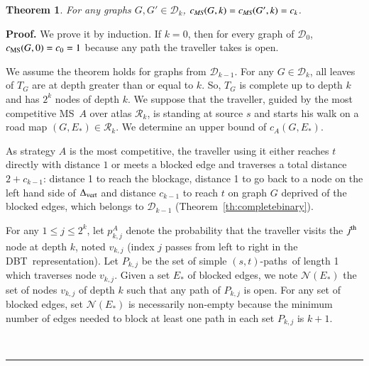 \documentclass[preprint]{elsarticle}
\newtheorem{theorem}{Theorem}
\newenvironment{proof}[1][Proof]{\textbf{#1.} }{\ \rule{0.5em}{0.5em}}
\newcommand{\ith}[1]{#1^{\mbox{\scriptsize{th}}}}
\newcommand{\stpaths}{$(s,t)$-paths}
\newcommand{\mcalr}{\mathcal{R}}
\newcommand{\mcald}{\mathcal{D}}
\newcommand{\mcaln}{\mathcal{N}}
\newcommand{\mts}{MS}
\newcommand{\deltavert}{\Delta_{\mbox{\scriptsize{vert}}}}
\newcommand{\cms}{c_{\mbox{\scriptsize{MS}}}}
\newcommand{\ebt}{DBT}
\begin{document}
\begin{theorem}
For any graphs $G, G' \in \mcald_k$, $c_{\emph{\scriptsize{MS}}}(G,k) = c_{\emph{\scriptsize{MS}}}(G',k) = c_k$.
\label{th:equalcompetitive}
\end{theorem}
\begin{proof}
We prove it by induction. If $k = 0$, then for every graph of $\mcald_0$, $\cms(G,0) = c_0 = 1$ because any path the traveller takes is open.

We assume the theorem holds for graphs from $\mcald_{k-1}$. For any $G \in \mcald_k$, all leaves of $T_G$ are at depth greater than or equal to $k$. So, $T_G$ is complete up to depth $k$ and has $2^k$ nodes of depth $k$. We suppose that the traveller, guided by the most competitive \mts ~$A$ over atlas $\mcalr_k$, is standing at source $s$ and starts his walk on a road map $\left(G,E_*\right) \in \mcalr_k$. We determine an upper bound of $c_A(G, E_*)$.

As strategy $A$ is the most competitive, the traveller using it either reaches $t$ directly with distance $1$ or meets a blocked edge and traverses a total distance $2 + c_{k-1}$: distance 1 to reach the blockage, distance 1 to go back to a node on the left hand side of $\deltavert$ and distance $c_{k-1}$ to reach $t$ on graph $G$ deprived of the blocked edges, which belongs to $\mcald_{k-1}$ (Theorem~\ref{th:completebinary}).

For any $1 \le j \le 2^k$, let $p_{k,j}^A$ denote the probability that the traveller visits the $\ith{j}$ node at depth $k$, noted $v_{k,j}$ (index $j$ passes from left to right in the \ebt ~representation). 
Let $P_{k,j}$ be the set of simple \stpaths ~of length 1 which traverses node $v_{k,j}$.
Given a set $E_*$ of blocked edges, we note $\mcaln(E_*)$ the set of nodes $v_{k,j}$ of depth $k$ such that any path of $P_{k,j}$ is open. For any set of blocked edges, set $\mcaln(E_*)$ is necessarily non-empty because the minimum number of edges needed to block at least one path in each set $P_{k,j}$ is $k+1$. 


\end{proof}
\end{document}
